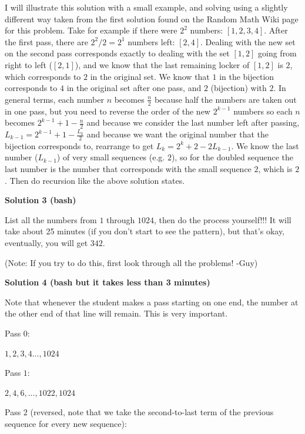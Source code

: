 \begin{enumerate}
 
I will illustrate this solution with a small example, and solving using a slightly different way taken from the first solution found on the Random Math Wiki page for this problem. Take for example if there were $2^2$ numbers: $[1 , 2 , 3 , 4]$. After the first pass, there are $2^2/2 = 2^1$ numbers left: $[2 , 4]$. Dealing with the new set on the second pass corresponds exactly to dealing with the set $[1 , 2]$ going from right to left ($[2 , 1]$), and we know that the last remaining locker of $[1 , 2]$ is $2$, which corresponds to $2$ in the original set. We know that $1$ in the bijection corresponds to $4$ in the original set after one pass, and $2$ (bijection) with $2$. In general terms, each number $n$ becomes $\frac{n}{2}$ because half the numbers are taken out in one pass, but you need to reverse the order of the new $2^{k-1}$ numbers so each $n$ becomes $2^{k-1} + 1 - \frac{n}{2}$ and because we consider the last number left after passing, $L_{k-1} = 2^{k-1} + 1 - \frac{L_k}{2}$ and because we want the original number that the bijection corresponds to, rearrange to get $L_{k} = 2^{k} +2 -2L_{k-1}$. We know the last number ($L_{k-1}$) of very small sequences (e.g. $2$), so for the doubled sequence the last number is the number that corresponds with the small sequence $2$, which is $2$. Then do recursion like the above solution states.

 



\textbf{Solution 3 (bash)}

List all the numbers from $1$ through $1024$, then do the process yourself!!! It will take about 25 minutes (if you don't start to see the pattern), but that's okay, eventually, you will get $\boxed{342}$.

 (Note: If you try to do this, first look through all the problems! -Guy)

 



\textbf{Solution 4 (bash but it takes less than 3 minutes)}

Note that whenever the student makes a pass starting on one end, the number at the other end of that line will remain. This is very important.

 Pass $0$:

 $1,2,3,4...,1024$

 Pass $1$:

 $2,4,6,...,1022, 1024$

 Pass $2$ (reversed, note that we take the second-to-last term of the previous sequence for every new sequence):


\end{enumerate}
